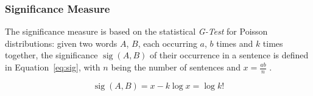 \subsubsection*{Significance Measure}

The significance measure is based on the statistical \emph{G-Test} for Poisson
distributions: given two words $A$, $B$, each occurring $a$, $b$ times and $k$
times together, the significance $\operatorname{sig}(A, B)$ of their occurrence
in a sentence is defined in Equation~\ref{eq:sig}, with $n$ being the number of
sentences and $x = \frac{ab}{n}$ \citep{biemann2004language}.

\begin{equation}
  \label{eq:sig}
  \operatorname{sig}(A,B) = x - k \log x = \log k!
\end{equation}


